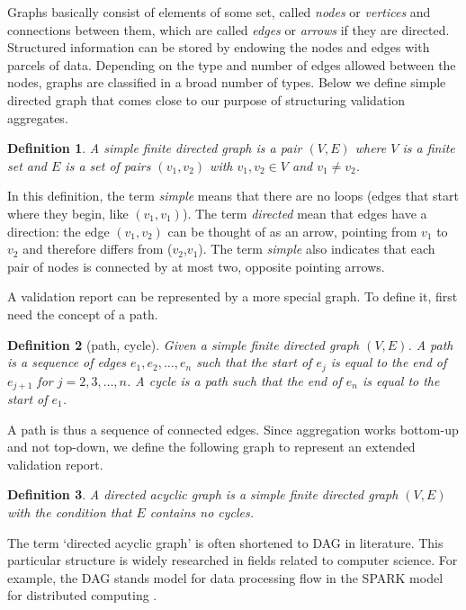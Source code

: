 \documentclass[a4paper, 11pt,titlepage]{article}
\newtheorem{definition}{Definition}
\begin{document}
Graphs basically consist of elements of some set, called \emph{nodes} or
\emph{vertices} and connections between them, which are called \emph{edges} or
\emph{arrows} if they are directed. Structured information can be stored by
endowing the nodes and edges with parcels of data.  Depending on the type and
number of edges allowed between the nodes, graphs are classified in a broad
number of types.  Below we define simple directed graph that comes close to our
purpose of structuring validation aggregates.
%
\begin{definition}
A \emph{simple finite directed graph} is a pair  $(V,E)$ where $V$ is a finite set and $E$
is a set of pairs $(v_1,v_2)$ with $v_1,v_2\in V$ and $v_1\not=v_2$.
\end{definition}
In this definition, the term \emph{simple} means that there are no loops (edges
that start where they begin, like $(v_1,v_1)$). The term \emph{directed} mean
that edges have a direction: the edge $(v_1,v_2)$ can be thought of as an
arrow, pointing from $v_1$ to $v_2$ and therefore differs from ($v_2$,$v_1$).
The term \emph{simple} also indicates that each pair of nodes is connected by
at most two, opposite pointing arrows.

A validation report can be represented by a more special graph. To define
it, first need the concept of a path.
\begin{definition}[path, cycle]
Given a simple finite directed graph $(V,E)$. A \emph{path} is a sequence of
edges $e_1,e_2,\ldots,e_n$ such that the start of $e_j$ is equal to the end of
$e_{j+1}$ for $j=2,3,\ldots,n$. A \emph{cycle} is a path such that the end of
$e_n$ is equal to the start of $e_1$.
\end{definition}
A path is thus a sequence of connected edges. Since aggregation works bottom-up
and not top-down, we define the following graph to represent an extended
validation report.
\begin{definition}
A \emph{directed acyclic graph} is a simple finite directed graph $(V,E)$ with
the condition that $E$ contains no cycles.
\end{definition}
%
The term `directed acyclic graph' is often shortened to DAG in literature. This
particular structure is widely researched in fields related to computer
science. For example, the DAG stands model for data processing flow in the
SPARK model for distributed computing \citep{gupta2003spark}. 
\end{document}
